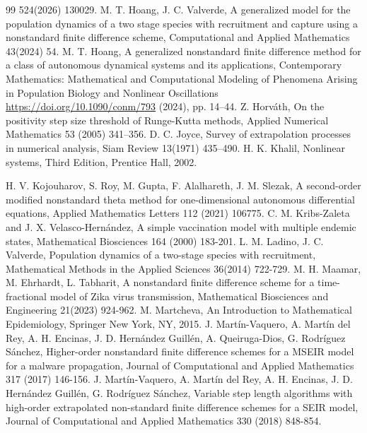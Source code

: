 \documentclass[12pt]{article}
\theoremstyle{definition}
\theoremstyle{remark}
\numberwithin{equation}{section}
\begin{document}
\begin{thebibliography}{99}
524(2026) 130029.
M. T. Hoang, J. C. Valverde, A generalized model for the population dynamics of a two
stage species with recruitment and capture using a
nonstandard finite difference scheme, Computational and Applied Mathematics 43(2024) 54.
M. T. Hoang,  A generalized nonstandard finite difference method for a class of autonomous dynamical systems and its applications, Contemporary Mathematics: Mathematical and Computational Modeling of Phenomena Arising in Population Biology and Nonlinear Oscillations \url{https://doi.org/10.1090/conm/793} (2024), pp. 14--44.
Z. Horv\'ath, {On the positivity step size threshold of Runge-Kutta methods},  Applied Numerical Mathematics {53} (2005) 341--356.
%
D. C. Joyce, Survey of extrapolation processes in numerical analysis, Siam Review 13(1971) 435--490.
%
H. K. Khalil, { Nonlinear systems}, Third Edition, Prentice Hall, 2002.

H. V. Kojouharov, S. Roy, M. Gupta, F. Alalhareth, J. M. Slezak, A second-order modified nonstandard theta method for one-dimensional autonomous differential equations, Applied Mathematics Letters 112 (2021) 106775.
C. M. Kribs-Zaleta and J. X. Velasco-Hern\'andez, {A simple vaccination model with multiple endemic states}, Mathematical Biosciences {164} (2000) 183-201.
L. M. Ladino, J. C. Valverde, Population dynamics of a two-stage species with recruitment, Mathematical Methods
in the Applied Sciences 36(2014) 722-729.
M. H. Maamar, M. Ehrhardt, L. Tabharit, A nonstandard finite difference scheme for a time-fractional model of Zika
virus transmission, Mathematical Biosciences and Engineering 21(2023) 924-962.
M. Martcheva, {An Introduction to Mathematical Epidemiology}, Springer New York, NY, 2015.
%
J. Mart\'in-Vaquero, A. Mart\'in del Rey, A. H. Encinas, J. D. Hern\'andez Guill\'en, A. Queiruga-Dios, G. Rodr\'iguez S\'anchez, Higher-order nonstandard finite difference schemes for a
MSEIR model for a malware propagation, Journal of Computational and Applied Mathematics 317 (2017) 146-156.
J. Mart\'in-Vaquero, A. Mart\'in del Rey, A. H. Encinas, J. D. Hern\'andez Guill\'en, G. Rodr\'iguez S\'anchez, Variable step length algorithms with high-order extrapolated
non-standard finite difference schemes for a SEIR model, Journal of Computational and Applied Mathematics 330 (2018) 848-854.



\end{thebibliography}
\end{document}
